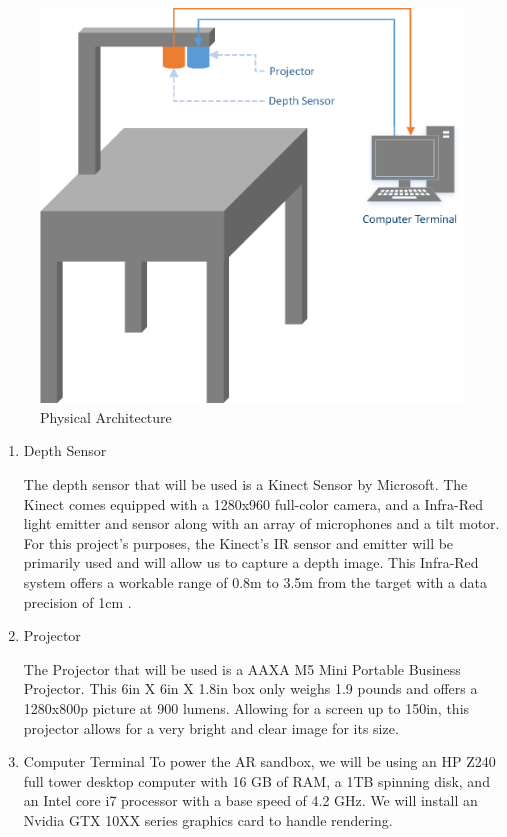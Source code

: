 \begin{figure}[H]
	\centering
	\includegraphics[width=6in]{PhysicalDiagram}
    \caption{Physical Architecture}
    \label{fig:physicalarchitecture}
\end{figure}
\begin{enumerate}
\item{Depth Sensor}

The depth sensor that will be used is a Kinect Sensor by Microsoft.  
The Kinect comes equipped with a 1280x960 full-color camera, and a Infra-Red light emitter and sensor along with an array of microphones and a tilt motor.
For this project's purposes, the Kinect's IR sensor and emitter will be primarily used and will allow us to capture a depth image.
This Infra-Red system offers a workable range of 0.8m to 3.5m from the target with a data precision of 1cm .

\item{Projector}

The Projector that will be used is a AAXA M5 Mini Portable Business Projector.
This 6in X 6in X 1.8in box only weighs 1.9 pounds and offers a 1280x800p picture at 900 lumens.
Allowing for a screen up to 150in, this projector allows for a very bright and clear image for its size.


\item{Computer Terminal}
To power the AR sandbox, we will be using an HP Z240 full tower desktop computer with 16 GB of RAM, a 1TB spinning disk, and an Intel core i7 processor with a base speed of 4.2 GHz. We will install an Nvidia GTX 10XX series graphics card to handle rendering.
\end{enumerate}

